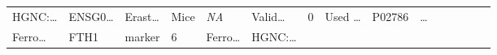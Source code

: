 \documentclass[
]{article}
\begin{document}
\begin{longtable}[]{@{}lllllllllllllll@{}}
\begin{minipage}[t]{0.05\columnwidth}
HGNC:\ldots{}\strut
\end{minipage} & \begin{minipage}[t]{0.05\columnwidth}\raggedright
ENSG0\ldots{}\strut
\end{minipage} & \begin{minipage}[t]{0.05\columnwidth}\raggedright
Erast\ldots{}\strut
\end{minipage} & \begin{minipage}[t]{0.04\columnwidth}\raggedright
Mice\strut
\end{minipage} & \begin{minipage}[t]{0.05\columnwidth}\raggedright
\emph{NA}\strut
\end{minipage} & \begin{minipage}[t]{0.05\columnwidth}\raggedright
Valid\ldots{}\strut
\end{minipage} & \begin{minipage}[t]{0.05\columnwidth}\raggedright
0\strut
\end{minipage} & \begin{minipage}[t]{0.05\columnwidth}\raggedright
Used \ldots{}\strut
\end{minipage} & \begin{minipage}[t]{0.05\columnwidth}\raggedright
P02786\strut
\end{minipage} & \begin{minipage}[t]{0.02\columnwidth}\raggedright
\ldots{}\strut
\end{minipage}\tabularnewline
\begin{minipage}[t]{0.05\columnwidth}\raggedright
Ferro\ldots{}\strut
\end{minipage} & \begin{minipage}[t]{0.04\columnwidth}\raggedright
FTH1\strut
\end{minipage} & \begin{minipage}[t]{0.04\columnwidth}\raggedright
marker\strut
\end{minipage} & \begin{minipage}[t]{0.02\columnwidth}\raggedright
6\strut
\end{minipage} & \begin{minipage}[t]{0.05\columnwidth}\raggedright
Ferro\ldots{}\strut
\end{minipage} & \begin{minipage}[t]{0.05\columnwidth}\raggedright
HGNC:\ldots{}\strut
\end{minipage} & \begin{minipage}[t]{0.05\columnwidth}\raggedright

\end{minipage}
\end{longtable}
\end{document}
